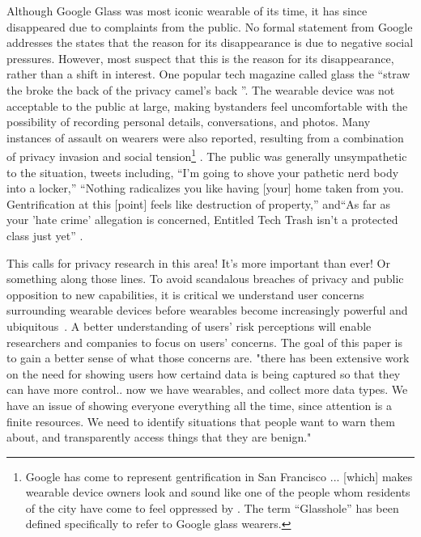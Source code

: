Although Google Glass was most iconic wearable of its time, it has since disappeared due to complaints from the public\cite{13_google_2015}. No formal statement from Google addresses the states that the reason for its disappearance is due to negative social pressures. However, most suspect that this is the reason for its disappearance, rather than a shift in interest. One popular tech magazine called glass the ``straw the broke the back of the privacy camel's back \cite{14_dvorak_2014}''. The wearable device was not acceptable to the public at large, making bystanders feel uncomfortable with the possibility of recording personal details, conversations, and photos. Many instances of assault \cite{1_russell_2014, 15_mashable_2014, 16_gross_2014} on wearers were also reported, resulting from a combination of privacy invasion and social tension\footnote{Google has come to represent gentrification in San Francisco ... [which] makes wearable device owners look and sound like one of the people whom residents of the city have come to feel oppressed by \cite{17_matyszczyk_2014}. The term ``Glasshole'' \cite{18_google_2015} has been defined specifically to refer to Google glass wearers.} . The public was generally unsympathetic to the situation, tweets including, ``I'm going to shove your pathetic nerd body into a locker,'' ``Nothing radicalizes you like having [your] home taken from you. Gentrification at this [point] feels like destruction of property,'' and``As far as your 'hate crime' allegation is concerned, Entitled Tech Trash isn't a protected class just yet'' \cite{1_russell_2014,15_mashable_2014}.

{\color {red} This calls for privacy research in this area! It's more important than ever! Or something along those lines.}  To avoid scandalous breaches of privacy and public opposition to new capabilities, it is critical we understand user concerns surrounding wearable devices before wearables become increasingly powerful and ubiquitous~\cite{Implants}. A better understanding of users' risk perceptions will enable researchers and companies to focus on users' concerns. The goal of this paper is to gain a better sense of what those concerns are.  {\color {red} "there has been extensive work on the need for showing users how certaind data is being captured so that they can have more control.. now we have wearables, and collect more data types. We have an issue of showing everyone everything all the time, since attention is a finite resources. We need to identify situations that people want to warn them about, and transparently access things that they are benign."}

